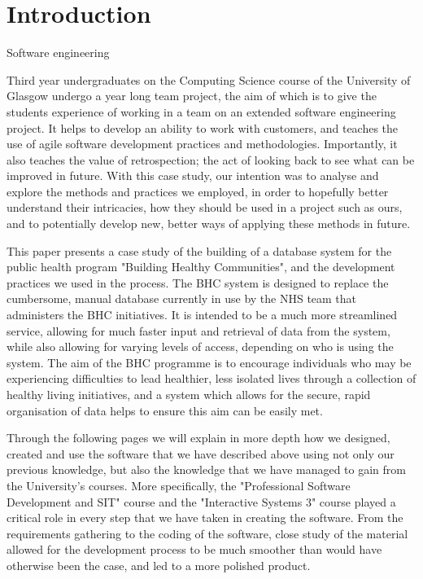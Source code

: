 \documentclass{l3proj}
\begin{document}
\educationalconsent

\newpage

\section{Introduction}

Software engineering 

Third year undergraduates on the Computing Science course of the University of Glasgow undergo a year long team project, the aim of which is to give the students experience of working in a team on an extended software engineering project. It helps to develop an ability to work with customers, and teaches the use of agile software development practices and methodologies. Importantly, it also teaches the value of retrospection; the act of looking back to see what can be improved in future. With this case study, our intention was to analyse and explore the methods and practices we employed, in order to hopefully better understand their intricacies, how they should be used in a project such as ours, and to potentially develop new, better ways of applying these methods in future.

This paper presents a case study of the building of a database system for the public health program "Building Healthy Communities", and the development practices we used in the process. The BHC system is designed to replace the cumbersome, manual database currently in use by the NHS team that administers the BHC initiatives. It is intended to be a much more streamlined service, allowing for much faster input and retrieval of data from the system, while also allowing for varying levels of access, depending on who is using the system. The aim of the BHC programme is to encourage individuals who may be experiencing difficulties to lead healthier, less isolated lives through a collection of healthy living initiatives, and a system which allows for the secure, rapid organisation of data helps to ensure this aim can be easily met.

Through the following pages we will explain in more depth how we designed, created and use the software that we have described above using not only our previous knowledge, but also the knowledge that we have managed to gain from the University's courses. More specifically, the "Professional Software Development and SIT" course and the "Interactive Systems 3" course played a critical role in every step that we have taken in creating the software. From the requirements gathering to the coding of the software, close study of the material allowed for the development process to be much smoother than would have otherwise been the case, and led to a more polished product.
\end{document}
